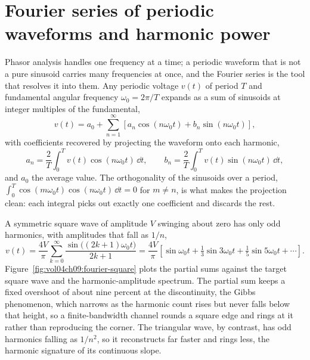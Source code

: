 \section{Fourier series of periodic waveforms and harmonic power}
\label{sec:vol04ch09:fourier}

Phasor analysis handles one frequency at a time; a periodic waveform that
is not a pure sinusoid carries many frequencies at once, and the Fourier
series is the tool that resolves it into them. Any periodic voltage
$v(t)$ of period $T$ and fundamental angular frequency
$\omega_0 = 2\pi/T$ expands as a sum of sinusoids at integer multiples of
the fundamental,
\[
v(t) = a_0 + \sum_{n=1}^{\infty}
\left[a_n\cos(n\omega_0 t) + b_n\sin(n\omega_0 t)\right],
\]
with coefficients recovered by projecting the waveform onto each harmonic,
\[
a_n = \frac{2}{T}\int_0^T v(t)\cos(n\omega_0 t)\,\dd t,
\qquad
b_n = \frac{2}{T}\int_0^T v(t)\sin(n\omega_0 t)\,\dd t,
\]
and $a_0$ the average value. The orthogonality of the sinusoids over a
period, $\int_0^T \cos(m\omega_0 t)\cos(n\omega_0 t)\,\dd t = 0$ for
$m \neq n$, is what makes the projection clean: each integral picks out
exactly one coefficient and discards the rest.

A symmetric square wave of amplitude $V$ swinging about zero has only odd
harmonics, with amplitudes that fall as $1/n$,
\[
v(t) = \frac{4V}{\pi}\sum_{k=0}^{\infty}
\frac{\sin\!\big((2k+1)\omega_0 t\big)}{2k+1}
= \frac{4V}{\pi}\left[\sin\omega_0 t + \tfrac{1}{3}\sin 3\omega_0 t
+ \tfrac{1}{5}\sin 5\omega_0 t + \cdots\right].
\]
Figure~\ref{fig:vol04ch09:fourier-square} plots the partial sums against
the target square wave and the harmonic-amplitude spectrum. The partial
sum keeps a fixed overshoot of about nine percent at the discontinuity,
the Gibbs phenomenon, which narrows as the harmonic count rises but never
falls below that height, so a finite-bandwidth channel rounds a square
edge and rings at it rather than reproducing the corner. The triangular
wave, by contrast, has odd harmonics falling as $1/n^{2}$, so it
reconstructs far faster and rings less, the harmonic signature of its
continuous slope.



